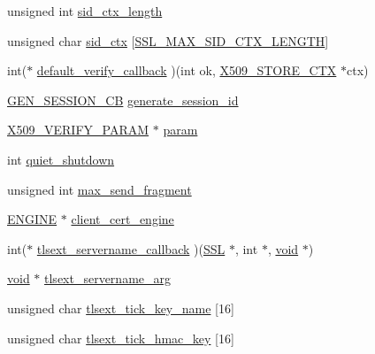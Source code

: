 \begin{DoxyCompactItemize}
unsigned int \hyperlink{structssl__ctx__st_a924f0b0c8d0e6c35bac8a124589df9c2}{sid\+\_\+ctx\+\_\+length}
\item 
unsigned char \hyperlink{structssl__ctx__st_a26dc95db49d98798375078f7c1653ba4}{sid\+\_\+ctx} \mbox{[}\hyperlink{ssl_2ssl_8h_a5cef804495c6414283f4f29d4cea0dd0}{S\+S\+L\+\_\+\+M\+A\+X\+\_\+\+S\+I\+D\+\_\+\+C\+T\+X\+\_\+\+L\+E\+N\+G\+TH}\mbox{]}
\item 
int($\ast$ \hyperlink{structssl__ctx__st_a926559d398d371b98329d281c7d3bc51}{default\+\_\+verify\+\_\+callback} )(int ok, \hyperlink{crypto_2ossl__typ_8h_ae681945a2cf88d6337137dc0260a1545}{X509\+\_\+\+S\+T\+O\+R\+E\+\_\+\+C\+TX} $\ast$ctx)
\item 
\hyperlink{ssl_2ssl_8h_a65a9d48d5b4f31797d3ce43e3ac7a8a1}{G\+E\+N\+\_\+\+S\+E\+S\+S\+I\+O\+N\+\_\+\+CB} \hyperlink{structssl__ctx__st_af147f6b9a405e9e8a94d7e5185381d57}{generate\+\_\+session\+\_\+id}
\item 
\hyperlink{crypto_2x509_2x509__vfy_8h_a9b8209a7a29bafa279e1b5bc5f81cb23}{X509\+\_\+\+V\+E\+R\+I\+F\+Y\+\_\+\+P\+A\+R\+AM} $\ast$ \hyperlink{structssl__ctx__st_a93a023e30bcb76ab78c9bdb0db7a24f8}{param}
\item 
int \hyperlink{structssl__ctx__st_aa8eaa5b8fc4a19fa46dcac8863276b40}{quiet\+\_\+shutdown}
\item 
unsigned int \hyperlink{structssl__ctx__st_a15c488cf6f57671d97ad93153fdc5965}{max\+\_\+send\+\_\+fragment}
\item 
\hyperlink{crypto_2ossl__typ_8h_abac45b251498719318e60ab8d6192510}{E\+N\+G\+I\+NE} $\ast$ \hyperlink{structssl__ctx__st_adf66435c67b385019a86890109ea7e69}{client\+\_\+cert\+\_\+engine}
\item 
int($\ast$ \hyperlink{structssl__ctx__st_aec1386a13ac4b445fb339a3cf79007d6}{tlsext\+\_\+servername\+\_\+callback} )(\hyperlink{crypto_2ossl__typ_8h_a71f21e09bf365489dab9d85bd4785e24}{S\+SL} $\ast$, int $\ast$, \hyperlink{hw__4758__cca_8h_afad4d591c7931ff6dc5bf69c76c96aa0}{void} $\ast$)
\item 
\hyperlink{hw__4758__cca_8h_afad4d591c7931ff6dc5bf69c76c96aa0}{void} $\ast$ \hyperlink{structssl__ctx__st_a027be2aea01998bb22fc9e8bc5fe0c28}{tlsext\+\_\+servername\+\_\+arg}
\item 
unsigned char \hyperlink{structssl__ctx__st_a6fefb6894992aa7a7940ebbb2e708386}{tlsext\+\_\+tick\+\_\+key\+\_\+name} \mbox{[}16\mbox{]}
\item 
unsigned char \hyperlink{structssl__ctx__st_a271da329d9c794b5bf28c1f17eaf05ba}{tlsext\+\_\+tick\+\_\+hmac\+\_\+key} \mbox{[}16\mbox{]}

\end{DoxyCompactItemize}
